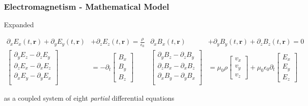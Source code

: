 \documentclass{beamer}
\begin{document}
\begin{frame}
    \frametitle{Electromagnetism - Mathematical Model}

    Expanded

    \footnotesize{\begin{equation}
    \begin{aligned}
        \partial_x E_x(t, \mathbf{r}) + \partial_y E_y(t, \mathbf{r}) &+ \partial_z E_z(t, \mathbf{r}) = \frac{\rho}{\epsilon_0}                 & \partial_x B_x(t, \mathbf{r}) &+ \partial_y B_y(t, \mathbf{r}) + \partial_z B_z(t, \mathbf{r})  = 0 \\
        \begin{bmatrix}
            \partial_y E_z - \partial_z E_y \\
            \partial_z E_x - \partial_x E_z \\
            \partial_x E_y - \partial_y E_x \\
        \end{bmatrix} &= -\partial_t \begin{bmatrix} B_x \\ B_y \\ B_z \end{bmatrix} & \begin{bmatrix}
            \partial_y B_z - \partial_z B_y \\
            \partial_z B_x - \partial_x B_z \\
            \partial_x B_y - \partial_y B_x \\
        \end{bmatrix} &= \mu_0 \rho \begin{bmatrix} v_x \\ v_y \\ v_z \end{bmatrix} + \mu_0 \epsilon_0 \partial_t \begin{bmatrix} E_x \\ E_y \\ E_z \end{bmatrix}
    \end{aligned}
    \end{equation}}

    \normalsize as a coupled system of eight \emph{partial} differential equations

\end{frame}
\end{document}
